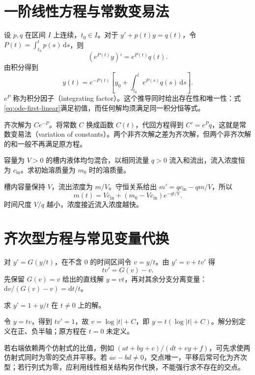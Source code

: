 \documentclass[UTF8,12pt,a4paper,fontset=fandol]{ctexbook}
\begin{document}
\section{一阶线性方程与常数变易法}
设 $p,q$ 在区间 $I$ 上连续，$t_0\in I$。对于 $y'+p(t)y=q(t)$，令 $P(t)=\int_{t_0}^t p(s)\,\mathrm ds$，则
\[
 (e^{P(t)}y)'=e^{P(t)}q(t).
\]
由积分得到
\begin{equation}
 y(t)=e^{-P(t)}\left[y_0+\int_{t_0}^t e^{P(s)}q(s)\,\mathrm ds\right].
 \label{eq:ode-first-linear}
\end{equation}
$e^P$ 称为积分因子（integrating factor）。这个推导同时给出存在性和唯一性：式\eqref{eq:ode-first-linear}满足初值，而任何解均须满足同一积分恒等式。

齐次解为 $Ce^{-P}$。将常数 $C$ 换成函数 $C(t)$，代回方程得到 $C'=e^Pq$，这就是常数变易法（variation of constants）。两个非齐次解之差为齐次解，但两个非齐次解的和一般不再满足原方程。

\begin{example}[混合槽]
容量为 $V>0$ 的槽内液体均匀混合，以相同流量 $q>0$ 流入和流出，流入浓度恒为 $c_{\mathrm{in}}$。求初始溶质量为 $m_0$ 时的溶质量。
\end{example}
\begin{solve}
槽内容量保持 $V$，流出浓度为 $m/V$。守恒关系给出 $m'=qc_{\mathrm{in}}-qm/V$，所以
\[
 m(t)=Vc_{\mathrm{in}}+(m_0-Vc_{\mathrm{in}})e^{-qt/V}.
\]
时间尺度 $V/q$ 越小，浓度接近流入浓度越快。
\end{solve}

\section{齐次型方程与常见变量代换}
对 $y'=G(y/t)$，在不含 $0$ 的时间区间令 $v=y/t$。由 $y'=v+tv'$ 得
\[
 tv'=G(v)-v.
\]
先保留 $G(v)=v$ 给出的直线解 $y=vt$，再对其余分支分离变量：$\mathrm dv/(G(v)-v)=\mathrm dt/t$。

\begin{example}
求 $y'=1+y/t$ 在 $t\ne0$ 上的解。
\end{example}
\begin{solve}
令 $y=tv$，得到 $tv'=1$，故 $v=\log|t|+C$，即 $y=t(\log|t|+C)$。解分别定义在正、负半轴；原方程在 $t=0$ 未定义。
\end{solve}

若右端依赖两个仿射式的比值，例如 $(at+by+c)/(dt+ey+f)$，可先求使两仿射式同时为零的交点并平移。若 $ae-bd\ne0$，交点唯一，平移后常可化为齐次型；若行列式为零，应利用线性相关结构另作代换，不能强行求不存在的交点。
\end{document}
